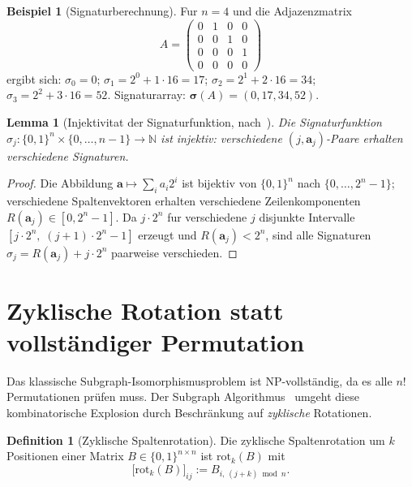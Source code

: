 ﻿\documentclass[12pt, a4paper, titlepage]{report}
\newtheorem{lemma}[theorem]{Lemma}
\theoremstyle{definition}
\newtheorem{definition}[theorem]{Definition}
\newtheorem{example}[theorem]{Beispiel}
\theoremstyle{remark}
\begin{document}
\begin{example}[Signaturberechnung]
\label{bsp:signatur}
Fur $n = 4$ und die Adjazenzmatrix
\[
  A = \begin{pmatrix}
    0 & 1 & 0 & 0 \\
    0 & 0 & 1 & 0 \\
    0 & 0 & 0 & 1 \\
    0 & 0 & 0 & 0
  \end{pmatrix}
\]
ergibt sich: $\sigma_0 = 0$; $\sigma_1 = 2^0 + 1 \cdot 16 = 17$;
$\sigma_2 = 2^1 + 2 \cdot 16 = 34$; $\sigma_3 = 2^2 + 3 \cdot 16 = 52$.
Signaturarray: $\bm{\sigma}(A) = (0, 17, 34, 52)$.
\end{example}

\begin{lemma}[Injektivitat der Signaturfunktion, nach~\citep{epp2026subgraph}]
\label{lem:injektivitaet}
Die Signaturfunktion $\sigma_j : \{0,1\}^n \times \{0,\ldots,n-1\} \to \mathbb{N}$
ist injektiv: verschiedene $(j, \bm{a}_j)$-Paare erhalten verschiedene Signaturen.
\end{lemma}

\begin{proof}
Die Abbildung $\bm{a} \mapsto \sum_i a_i 2^i$ ist bijektiv von $\{0,1\}^n$ nach
$\{0,\ldots,2^n-1\}$; verschiedene Spaltenvektoren erhalten verschiedene
Zeilenkomponenten $R(\bm{a}_j) \in [0, 2^n - 1]$.
Da $j \cdot 2^n$ fur verschiedene $j$ disjunkte Intervalle
$[j \cdot 2^n,\; (j+1) \cdot 2^n - 1]$ erzeugt und $R(\bm{a}_j) < 2^n$, sind
alle Signaturen $\sigma_j = R(\bm{a}_j) + j \cdot 2^n$ paarweise verschieden.
\end{proof}

\section{Zyklische Rotation statt vollständiger Permutation}

Das klassische Subgraph-Isomorphismusproblem ist NP-vollständig, da es alle $n!$
Permutationen prüfen muss. Der Subgraph Algorithmus~\citep{epp2026subgraph} umgeht
diese kombinatorische Explosion durch Beschränkung auf \emph{zyklische} Rotationen.

\begin{definition}[Zyklische Spaltenrotation]
\label{def:zyklrot}
Die zyklische Spaltenrotation um $k$ Positionen einer Matrix $B \in \{0,1\}^{n \times n}$
ist $\mathrm{rot}_k(B)$ mit
\begin{equation}
  \bigl[\mathrm{rot}_k(B)\bigr]_{ij} := B_{i,\,(j+k) \bmod n}.
  \label{eq:zyklrot}
\end{equation}
\end{definition}
\end{document}
